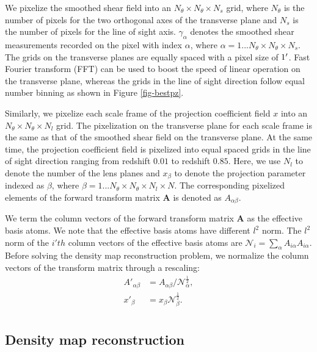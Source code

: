 \documentclass[twocolumn]{aastex62}
\begin{document}
We pixelize the smoothed shear field into an $N_\theta \times N_\theta \times
N_s$ grid, where $N_\theta$ is the number of pixels for the two orthogonal axes
of the transverse plane and $N_s$ is the number of pixels for the line of sight
axis. $\gamma_{\alpha}$ denotes the smoothed shear measurements recorded on the
pixel with index $\alpha$, where $\alpha=1...N_\theta \times N_\theta \times
N_s$. The grids on the transverse planes are equally spaced with a pixel size of
$1\mbox{$^\prime$}$.  Fast Fourier transform (FFT) can be used to boost the speed of
linear operation on the transverse plane, whereas the grids in the line of sight
direction follow equal number binning as shown in Figure \ref{fig-bestpz}.

Similarly, we pixelize each scale frame of the projection coefficient field $x$
into an $N_\theta \times N_\theta \times N_l$ grid. The pixelization on the
transverse plane for each scale frame is the same as that of the
smoothed shear field on the transverse plane. At the same time, the projection
coefficient field is pixelized into equal spaced grids in the line of sight
direction ranging from redshift $0.01$ to redshift $0.85$. Here, we use $N_l$
to denote the number of the lens planes and $x_{\beta}$ to denote the
projection parameter indexed as $\beta$, where $\beta=1...N_\theta \times
N_\theta \times N_l \times N$. The corresponding pixelized elements of the
forward transform matrix $\mathbf{A}$ is denoted as $A_{\alpha\beta}$.

We term the column vectors of the forward transform matrix $\mathbf{A}$ as the
effective basis atoms. We note that the effective basis atoms have different
$l^2$ norm. The $l^2$ norm of the $i'th$ column vectors of the effective basis
atoms are $\mathcal{N}_{i}=\sum_\alpha A_{i\alpha}A_{i\alpha}$. Before solving
the density map reconstruction problem, we normalize the column vectors of the
transform matrix through a rescaling:
\begin{equation}
\begin{split}
A'_{\alpha\beta}&=A_{\alpha\beta}/\mathcal{N}_{\alpha}^{\frac{1}{2}},\\
x'_{\beta}&=x_{\beta}\mathcal{N}_{\beta}^{\frac{1}{2}}.\\
\end{split}
\end{equation}

\subsection{Density map reconstruction}
\label{subsec:method-reconstruction}
\end{document}
